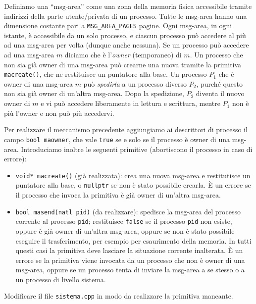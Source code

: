 Definiamo una ``msg-area'' come una zona della memoria fisica accessibile tramite indirizzi della parte utente/privata di un processo.
Tutte le msg-area hanno una dimensione costante pari a \verb|MSG_AREA_PAGES| pagine.
Ogni msg-area, in ogni istante, \`e accessibile da un solo processo, e ciascun processo pu\`o accedere al pi\`u ad una msg-area per volta
(dunque anche nessuna).  Se un processo pu\`o accedere ad una msg-area $m$ diciamo che \`e l'{\em owner} (temporaneo) di $m$.
Un processo che non sia gi\`a owner di una msg-area pu\`o crearne una nuova tramite la primitiva \verb|macreate()|, che ne restituisce
un puntatore alla base. Un processo $P_1$ che \`e owner di una msg-area $m$ pu\`o {\em spedirla} a un processo diverso $P_2$, purch\'e
questo non sia gi\`a owner di un'altra msg-area. Dopo la spedizione, $P_2$ diventa il nuovo owner di $m$ e vi pu\`o accedere liberamente
in lettura e scrittura, mentre $P_1$ non \`e pi\`u l'owner e non pu\`o pi\`u accedervi.

Per realizzare il meccanismo precedente aggiungiamo ai descrittori di processo il campo \verb|bool maowner|, che vale \verb|true| se e
solo se il processo \`e owner di una msg-area. Introduciamo inoltre le seguenti primitive (abortiscono il processo in caso di errore):

\begin{itemize}
  \item \verb|void* macreate()| (gi\`a realizzata): crea una nuova msg-area e restitutisce un puntatore alla base, o \verb|nullptr| se non
  \`e stato possibile crearla. \`E un errore se il processo che invoca la primitiva \`e gi\`a owner di un'altra msg-area.
  \item \verb|bool masend(natl pid)| (da realizzare): spedisce la msg-area del processo corrente al processo \verb|pid|; restituisce \verb|false| se
	il processo \verb|pid| non esiste, oppure \`e gi\`a owner di un'altra msg-area, oppure se non \`e stato possibile
	eseguire il trasferimento, per esempio per esaurimento della memoria. In tutti questi casi la primitiva deve lasciare
	la situazione corrente inalterata. \`E un errore se la primitiva viene invocata da un processo che non \`e owner di
	una msg-area, oppure se un processo tenta di inviare la msg-area a se stesso o a un processo di livello sistema.
\end{itemize}

Modificare il file \verb|sistema.cpp| in modo da realizzare la primitiva mancante.
